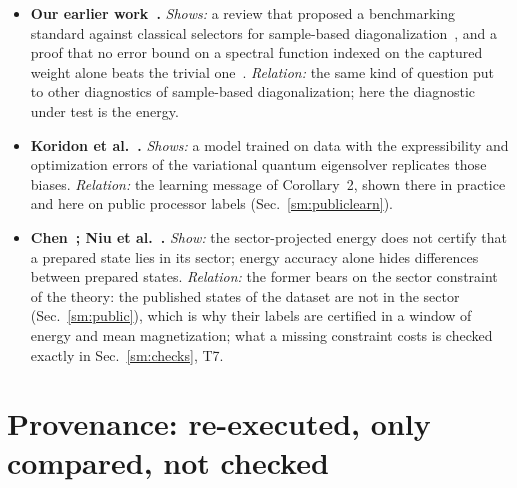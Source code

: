 \documentclass[aps,prx,onecolumn,10pt,nofootinbib,longbibliography,floatfix]{revtex4-2}
\theoremstyle{remark}
\begin{document}
\begin{itemize}
\item \textbf{Our earlier work~\cite{bonilla2026review,bonilla2026spectral}.} \emph{Shows:} a review that proposed a benchmarking standard against classical selectors for sample-based diagonalization~\cite{bonilla2026review}, and a proof that no error bound on a spectral function indexed on the captured weight alone beats the trivial one~\cite{bonilla2026spectral}. \emph{Relation:} the same kind of question put to other diagnostics of sample-based diagonalization; here the diagnostic under test is the energy.
\item \textbf{Koridon et al.~\cite{koridon2024}.} \emph{Shows:} a model trained on data with the expressibility and optimization errors of the variational quantum eigensolver replicates those biases. \emph{Relation:} the learning message of Corollary~2, shown there in practice and here on public processor labels (Sec.~\ref{sm:publiclearn}). %
\item \textbf{Chen~\cite{chen2026}; Niu et al.~\cite{niu2026}.} \emph{Show:} the sector-projected energy does not certify that a prepared state lies in its sector; energy accuracy alone hides differences between prepared states. \emph{Relation:} the former bears on the sector constraint of the theory: the published states of the dataset are not in the sector (Sec.~\ref{sm:public}), which is why their labels are certified in a window of energy and mean magnetization; what a missing constraint costs is checked exactly in Sec.~\ref{sm:checks}, T7. %
\end{itemize}

\section{Provenance: re-executed, only compared, not checked}
\label{sm:prov}
\end{document}
